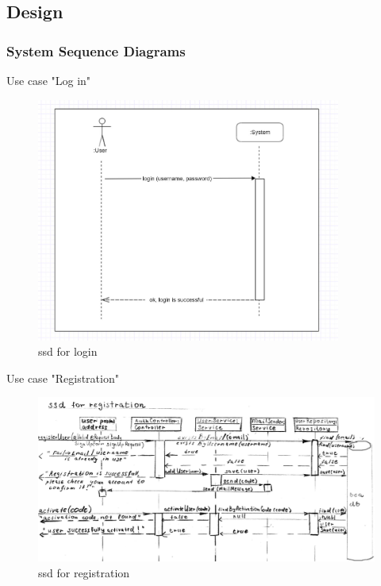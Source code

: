 \documentclass{scrartcl}
\begin{document}
\subsection{Design}
\subsubsection{System Sequence Diagrams}
 Use case "Log in"
\begin{figure}[H]
\centering
\includegraphics[width = 100mm]{ssd-login.JPG}
\caption{ssd for login}
\label{ssd for login}
\end{figure}


Use case "Registration"
\begin{figure}[H]
\centering
\includegraphics[width = 140mm]{ssd-reg.JPG}
\caption{ssd for registration}
\label{ssd for registration}
\end{figure}
\end{document}
